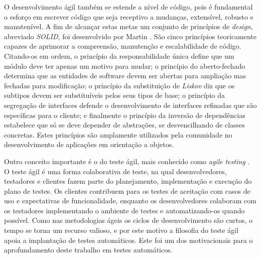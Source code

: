 O desenvolvimento ágil também se estende a nível de código, pois é fundamental o esforço em escrever código que seja receptivo a mudanças, extensível, robusto e manutenível. A fim de alcançar estas metas um conjunto de princípios de \emph{design}, abreviado \emph{SOLID}, foi desenvolvido por Martin \cite{martin}. São cinco princípios teoricamente capazes de aprimorar a compreensão, manutenção e escalabilidade de código. Citando-os em ordem, o princípio da responsabilidade única define que um módulo deve ter apenas um motivo para mudar; o princípio do aberto-fechado determina que as entidades de software devem ser abertas para ampliação mas fechadas para modificação; o princípio da substituição de \emph{Liskov} diz que os subtipos devem ser substituíveis pelos seus tipos de base; o princípio da segregação de interfaces defende o desenvolvimento de interfaces refinadas que são específicas para o cliente; e finalmente o princípio da inversão de dependências estabelece que só se deve depender de abstrações, se desvencilhando de classes concretas. Estes princípios são amplamente utilizados pela comunidade no desenvolvimento de aplicações em orientação a objetos.

Outro conceito importante é o do teste ágil, mais conhecido como \emph{agile testing} \cite{myers}. O teste ágil é uma forma colaborativa de teste, na qual desenvolvedores, testadores e clientes fazem parte do planejamento, implementação e execução do plano de testes. Os clientes contribuem para os testes de aceitação com casos de uso e expectativas de funcionalidade, enquanto os desenvolvedores colaboram com os testadores implementando o ambiente de testes e automatizando-os quando possível. Como nas metodologias ágeis os ciclos de desenvolvimento são curtos, o tempo se torna um recurso valioso, e por este motivo a filosofia do teste ágil apoia a implantação de testes automáticos. Este foi um dos motivacionais para o aprofundamento deste trabalho em testes automáticos.
